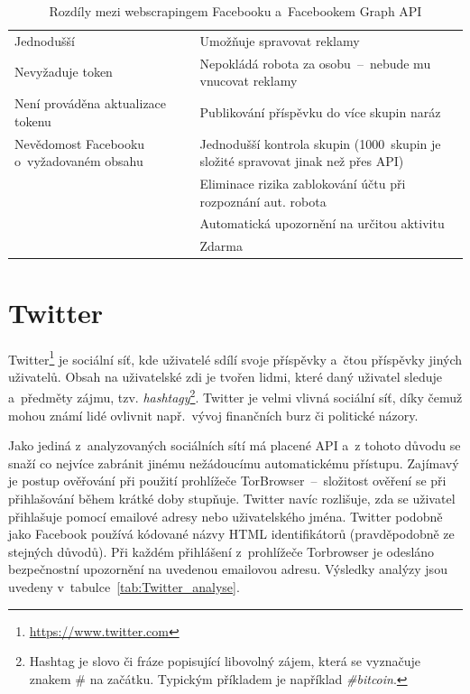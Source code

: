 \begin{table}[H]
\begin{tabularx}{\linewidth}{
    |>{\hsize=1\hsize}X|%
    >{\hsize=1\hsize}X|%
  }
\hline

\multicolumn{1}{|c|}{\textbf{Webscraping}} & \multicolumn{1}{|c|}{\textbf{Facebook Graph API}} \\ \hline
Jednodušší & Umožňuje spravovat reklamy \\ \hline
Nevyžaduje token & Nepokládá robota za osobu~--~nebude mu vnucovat reklamy \\ \hline
Není prováděna aktualizace tokenu & Publikování příspěvku do více skupin naráz \\ \hline
Nevědomost Facebooku o~vyžadovaném obsahu &  Jednodušší kontrola skupin (1000~skupin je složité spravovat jinak než přes API)\\ \hline
& Eliminace rizika zablokování účtu při rozpoznání aut. robota \\ \hline
& Automatická upozornění na určitou aktivitu \\ \hline
& Zdarma \\ \hline
\end{tabularx}

\caption{Rozdíly mezi webscrapingem Facebooku a~Facebookem Graph API}
\label{tab:FB_API_vs_webscraping}
\end{table}

\section{Twitter}
Twitter\footnote{\href{https://www.twitter.com}{https://www.twitter.com}} je sociální síť, kde uživatelé sdílí svoje příspěvky a~čtou příspěvky jiných uživatelů. Obsah na uživatelské zdi je tvořen lidmi, které daný uživatel sleduje a~předměty zájmu, tzv. \textit{hashtagy}\footnote{Hashtag je slovo či fráze popisující libovolný zájem, která se vyznačuje znakem \# na začátku. Typickým příkladem je například \textit{\#bitcoin}.}. Twitter je velmi vlivná sociální síť, díky čemuž mohou známí lidé ovlivnit např.~vývoj finančních burz či politické názory.

Jako jediná z~analyzovaných sociálních sítí má placené API a~z tohoto důvodu se snaží co nejvíce zabránit jinému nežádoucímu automatickému přístupu. Zajímavý je postup ověřování při použití prohlížeče TorBrowser~--~složitost ověření se při přihlašování během krátké doby stupňuje. Twitter navíc rozlišuje, zda se uživatel přihlašuje pomocí emailové adresy nebo uživatelského jména. Twitter podobně jako Facebook používá kódované názvy HTML identifikátorů (pravděpodobně ze stejných důvodů). Při každém přihlášení z~prohlížeče Torbrowser je odesláno bezpečnostní upozornění na uvedenou emailovou adresu. Výsledky analýzy jsou uvedeny v~tabulce~\ref{tab:Twitter_analyse}.

